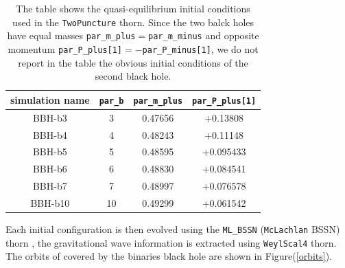 \begin{table}
\centering
\begin{tabular}{|c|c|c|c|}
\hline 
simulation name & \texttt{par\_b} & \texttt{par\_m\_plus} & \texttt{par\_P\_plus[1]} \\ 
\hline 
BBH-b3 & 3 & 0.47656
 & +0.13808 \\ 
BBH-b4 & 4 & 0.48243 & +0.11148 \\ 
BBH-b5 & 5 & 0.48595 & +0.095433 \\ 
BBH-b6 & 6 & 0.48830 & +0.084541 \\ 
BBH-b7 & 7 &  0.48997 & +0.076578 \\ 
BBH-b10 & 10 & 0.49299 & +0.061542 \\ 
\hline 
\end{tabular} 
\caption{The table shows the quasi-equilibrium initial conditions used in the \texttt{TwoPuncture} thorn. Since the two balck holes have equal masses \texttt{par\_m\_plus}$=$\texttt{par\_m\_minus} and opposite momentum \texttt{par\_P\_plus[1]}$=- $\texttt{par\_P\_minus[1]}, we do not report in the table the obvious initial conditions of the second black hole.}
\label{initial_conditions_bbh}
\end{table}
Each initial configuration is then evolved using the \texttt{ML\_BSSN} (\texttt{McLachlan} BSSN) thorn \cite{Brown:2008sb,McLachlan:web,Kranc:web}, the gravitational wave information is extracted using \texttt{WeylScal4} thorn.\\
The orbits of covered by the binaries black hole are shown in Figure(\ref{orbits}).
